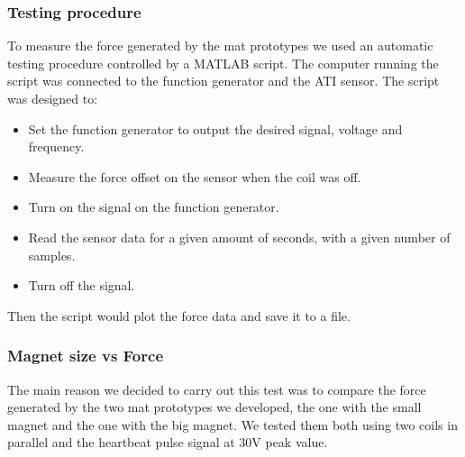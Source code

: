 \subsubsection{Testing procedure}
To measure the force generated by the mat prototypes we used an automatic testing procedure controlled by a MATLAB script.
The computer running the script was connected to the function generator and the ATI sensor.
The script was designed to:
\begin{itemize}
    \item Set the function generator to output the desired signal, voltage and frequency.
    \item Measure the force offset on the sensor when the coil was off.
    \item Turn on the signal on the function generator.
    \item Read the sensor data for a given amount of seconds, with a given number of samples.
    \item Turn off the signal.
\end{itemize}
Then the script would plot the force data and save it to a file.

\subsubsection{Magnet size vs Force}
The main reason we decided to carry out this test was to compare the force generated by the two mat prototypes we developed, the one with the small magnet and the one with the big magnet.
We tested them both using two coils in parallel and the heartbeat pulse signal at 30V peak value.

